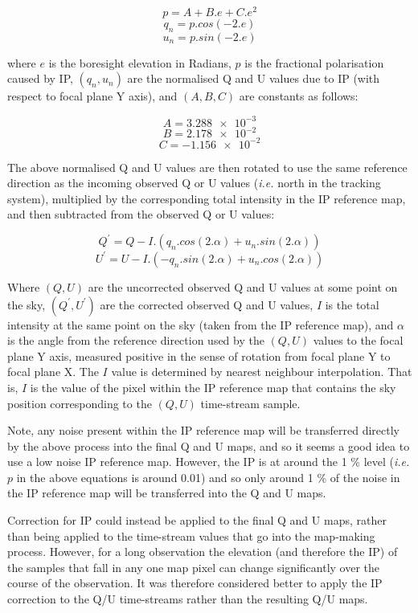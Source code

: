 \documentclass[twoside,11pt]{starlink}
\begin{document}
\[p = A + B.e + C.e^{2} \]
\[q_{n} = p.cos(-2.e) \]
\[u_{n} = p.sin(-2.e) \]

where $e$ is the boresight elevation in Radians, $p$ is the fractional
polarisation caused by IP, $(q_{n},u_{n})$ are the normalised Q and U
values due to IP (with respect to focal plane Y axis), and $(A,B,C)$ are
constants as follows:

\[A = \num{3.288e-3} \]
\[B = \num{2.178e-2} \]
\[C = \num{-1.156e-2} \]

The above normalised Q and U values are then rotated to use the same
reference direction as the incoming observed Q or U values (\emph{i.e.}
north in the tracking system), multiplied by the corresponding total intensity
in the IP reference map, and then subtracted from the observed Q or U values:

\[Q^{'} = Q - I.( q_{n}.cos(2.\alpha) + u_{n}.sin(2.\alpha) ) \]
\[U^{'} = U - I.( -q_{n}.sin(2.\alpha) + u_{n}.cos(2.\alpha) ) \]

Where $(Q,U)$ are the uncorrected observed Q and U values at some point
on the sky, $(Q^{'},U^{'})$ are the corrected observed Q and U values,
$I$ is the total intensity at the same point on the sky (taken from the
IP reference map), and $\alpha$ is the angle from the reference direction
used by the $(Q,U)$ values  to the focal plane Y axis, measured positive
in the sense of rotation from focal plane Y to focal plane X. The $I$
value is determined by nearest neighbour interpolation. That is, $I$ is
the value of the pixel within the IP reference map that contains the
sky position corresponding to the $(Q,U)$ time-stream sample.

Note, any noise present within the IP reference map will be transferred
directly by the above process into the final Q and U maps, and so it seems
a good idea to use a low noise IP reference map. However, the IP is at
around the 1 \% level  (\emph{i.e.} $p$ in the above equations is around
0.01) and so only around 1 \% of the noise in the IP reference map will
be transferred into the Q and U maps.

Correction for IP could instead be applied to the final Q and U maps,
rather than being applied to the time-stream values that go into the
map-making process. However, for a long observation the elevation (and
therefore the IP) of the samples that fall in any one map pixel can
change significantly over the course of the observation. It was therefore
considered better to apply the IP correction to the Q/U time-streams
rather than the resulting Q/U maps.
\end{document}
